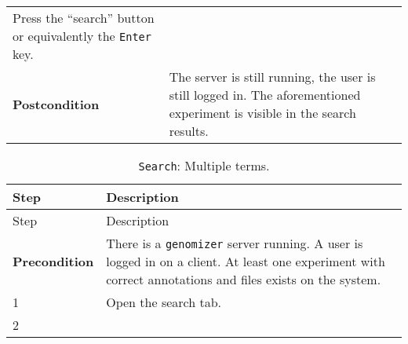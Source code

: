\begin{longtable}[c]{@{}ll@{}}
\begin{minipage}[t]{0.63\columnwidth}
Press the ``search'' button or equivalently the \texttt{Enter} key.
\strut\end{minipage}\tabularnewline
\begin{minipage}[t]{0.31\columnwidth}\raggedright\strut
\textbf{Postcondition}
\strut\end{minipage} &
\begin{minipage}[t]{0.63\columnwidth}\raggedright\strut
The server is still running, the user is still logged in. The
aforementioned experiment is visible in the search results.
\strut\end{minipage}\tabularnewline
\bottomrule
\end{longtable}

\begin{longtable}[c]{@{}ll@{}}
\caption{\texttt{Search}: Multiple terms.}\tabularnewline
\toprule
\begin{minipage}[b]{0.31\columnwidth}\raggedright\strut
Step
\strut\end{minipage} &
\begin{minipage}[b]{0.63\columnwidth}\raggedright\strut
Description
\strut\end{minipage}\tabularnewline
\midrule
\endfirsthead
\toprule
\begin{minipage}[b]{0.31\columnwidth}\raggedright\strut
Step
\strut\end{minipage} &
\begin{minipage}[b]{0.63\columnwidth}\raggedright\strut
Description
\strut\end{minipage}\tabularnewline
\midrule
\endhead
\begin{minipage}[t]{0.31\columnwidth}\raggedright\strut
\textbf{Precondition}
\strut\end{minipage} &
\begin{minipage}[t]{0.63\columnwidth}\raggedright\strut
There is a \texttt{genomizer} server running. A user is logged in on a
client. At least one experiment with correct annotations and files
exists on the system.
\strut\end{minipage}\tabularnewline
\begin{minipage}[t]{0.31\columnwidth}\raggedright\strut
1
\strut\end{minipage} &
\begin{minipage}[t]{0.63\columnwidth}\raggedright\strut
Open the search tab.
\strut\end{minipage}\tabularnewline
\begin{minipage}[t]{0.31\columnwidth}\raggedright\strut
2
\strut\end{minipage} &

\end{longtable}
